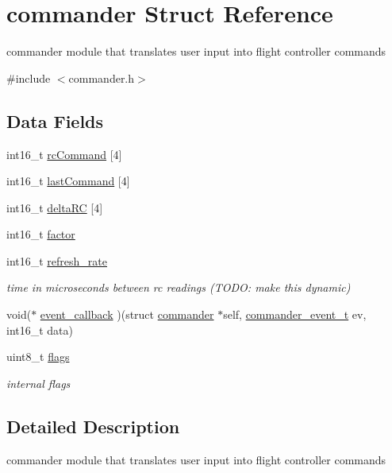 \hypertarget{structcommander}{\section{commander Struct Reference}
\label{structcommander}
}


commander module that translates user input into flight controller commands  




{\ttfamily \#include $<$commander.\+h$>$}

\subsection*{Data Fields}
\begin{DoxyCompactItemize}
\item 
int16\+\_\+t \hyperlink{structcommander_a6e769486c728fd934f8fabf8f819db2d}{rc\+Command} \mbox{[}4\mbox{]}
\item 
int16\+\_\+t \hyperlink{structcommander_af88801509d9aa119526243b345705a7e}{last\+Command} \mbox{[}4\mbox{]}
\item 
int16\+\_\+t \hyperlink{structcommander_abaa62c2bf4b77172cde393e2704635fc}{delta\+R\+C} \mbox{[}4\mbox{]}
\item 
int16\+\_\+t \hyperlink{structcommander_a4699ec2e2ef438235b39c79b6f1e3404}{factor}
\item 
int16\+\_\+t \hyperlink{structcommander_a5de951c54feab6654a90f5acbaecd546}{refresh\+\_\+rate}
\begin{DoxyCompactList}\small\item\em time in microseconds between rc readings (T\+O\+D\+O\+: make this dynamic) \end{DoxyCompactList}\item 
void($\ast$ \hyperlink{structcommander_a728bf75ac58c4031e3005ea4abe61cc3}{event\+\_\+callback} )(struct \hyperlink{structcommander}{commander} $\ast$self, \hyperlink{commander_8h_a0dea274d71bd4238f8b0ac384381f87b}{commander\+\_\+event\+\_\+t} ev, int16\+\_\+t data)
\item 
uint8\+\_\+t \hyperlink{structcommander_a24959e28d9524c801a34ddda56c21502}{flags}
\begin{DoxyCompactList}\small\item\em internal flags \end{DoxyCompactList}\end{DoxyCompactItemize}


\subsection{Detailed Description}
commander module that translates user input into flight controller commands 

